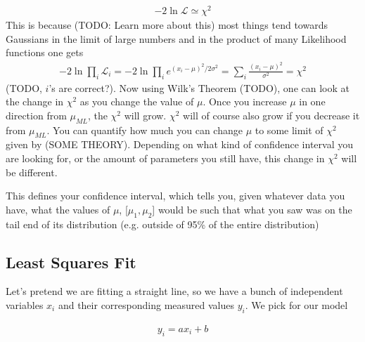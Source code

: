 \begin{align}
-2\ln\mathcal{L} \simeq \chi^2
\end{align}
This is because (TODO: Learn more about this) most things tend towards Gaussians in the limit of large numbers and in the product of many Likelihood functions one gets
\begin{align}
	-2\ln\prod_i\mathcal{L}_i = -2\ln\prod_i e^{(x_i-\mu)^2/2\sigma^2} = \sum_i\frac{(x_i-\mu)^2}{\sigma^2} = \chi^2
\end{align}
(TODO, $i$'s are correct?). Now using Wilk's Theorem (TODO), one can look at the change in $\chi^2$ as you change the value of $\mu$. Once you increase $\mu$ in one direction from $\mu_{ML}$, the $\chi^2$ will grow. $\chi^2$ will of course also grow if you decrease it from $\mu_{ML}$. You can quantify how much you can change $\mu$ to some limit of $\chi^2$ given by (SOME THEORY). Depending on what kind of confidence interval you are looking for, or the amount of parameters you still have, this change in $\chi^2$ will be different. 

This defines your confidence interval, which tells you, given whatever data you have, what the values of $\mu$,  [$\mu_1, \mu_2$] would be such that what you saw was on the tail end of its distribution (e.g. outside of 95\% of the entire distribution)

\subsection{Least Squares Fit}
Let's pretend we are fitting a straight line, so we have a bunch of independent variables $x_i$ and their corresponding measured values $y_i$. We pick for our model

\begin{align}
y_i = ax_i + b
\end{align}

